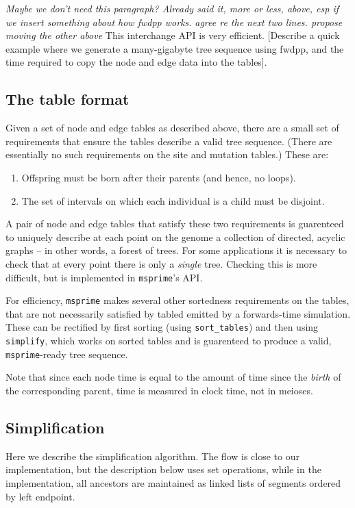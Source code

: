 \documentclass{article}
\newcommand{\msprime}{\texttt{msprime}}
\newcommand{\plr}[1]{{\em \color{blue} #1}}
\newcommand{\jda}[1]{{\em \color{cyan} #1}}
\begin{document}
\plr{Maybe we don't need this paragraph? Already said it, more or less, above, esp if we insert something about how fwdpp works.}
\jda{agree re the next two lines. propose moving the other above}
This interchange API is very efficient. [Describe a quick example where we generate
a many-gigabyte tree sequence using fwdpp, and the time required
to copy the node and edge data into the tables].

\subsection*{The table format}

Given a set of node and edge tables as described above,
there are a small set of requirements that ensure the tables
describe a valid tree sequence.
(There are essentially no such requirements on the site and mutation tables.)
These are:
\begin{enumerate}
    \item Offspring must be born after their parents (and hence, no loops).
    \item The set of intervals on which each individual is a child must be disjoint.
\end{enumerate}
A pair of node and edge tables that satisfy these two requirements
is guarenteed to uniquely describe at each point on the genome
a collection of directed, acyclic graphs -- in other words, a forest of trees.
For some applications it is necessary to check that at every point
there is only a \emph{single} tree.  
Checking this is more difficult, but is implemented in \msprime{}'s API.

For efficiency, \msprime{} makes several other sortedness requirements on the tables,
that are not necessarily satisfied by tabled emitted by a forwards-time simulation.
These can be rectified by first sorting (using \texttt{sort\_tables})
and then using \texttt{simplify}, which works on sorted tables
and is guarenteed to produce a valid, \msprime{}-ready tree sequence.

Note that since each node time is equal to the amount of time since the \emph{birth} of the
corresponding parent, time is measured in clock time, not in meioses.


\subsection*{Simplification}

Here we describe the simplification algorithm.
The flow is close to our implementation,
but the description below uses set operations,
while in the implementation,
all ancestors are maintained as linked lists of segments
ordered by left endpoint.
\end{document}
